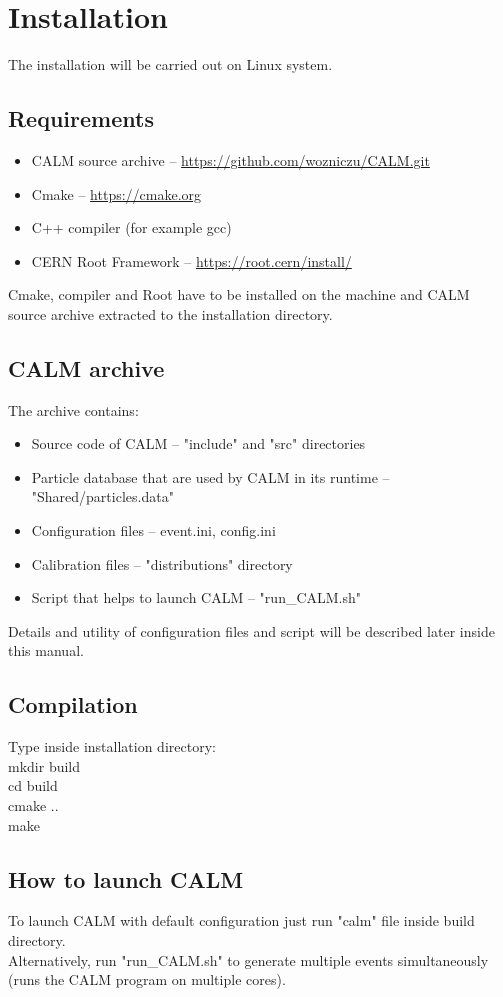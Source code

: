 \newpage
\section{Installation}
The installation will be carried out on Linux system.
\subsection{Requirements}
\begin{itemize}
    \item CALM source archive -- \url{https://github.com/wozniczu/CALM.git}
    \item Cmake -- \url{https://cmake.org}
    \item C++ compiler (for example gcc)
    \item CERN Root Framework -- \url{https://root.cern/install/}
\end{itemize}
Cmake, compiler and Root have to be installed on the machine and CALM source archive extracted to the installation directory.
\subsection{CALM archive}
The archive contains:
\begin{itemize}
    \item Source code of CALM -- "include" and "src" directories
    \item Particle database that are used by CALM in its runtime -- "Shared/particles.data"
    \item Configuration files -- event.ini, config.ini
    \item Calibration files -- "distributions" directory
    \item Script that helps to launch CALM -- "run\_CALM.sh"
\end{itemize}
Details and utility of configuration files and script will be described later inside this manual.
\subsection{Compilation}
Type inside installation directory:\\\tab mkdir build \\\tab cd build \\\tab cmake .. \\\tab make
\subsection{How to launch CALM}
To launch CALM with default configuration just run "calm" file inside build directory.\\
Alternatively, run "run\_CALM.sh" to generate multiple events simultaneously (runs the CALM program on multiple cores).